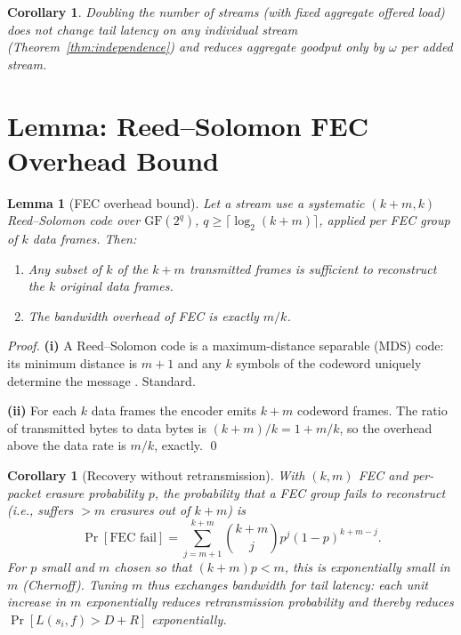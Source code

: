 \documentclass[11pt,a4paper]{article}
\newtheorem{lemma}[theorem]{Lemma}
\newtheorem{corollary}[theorem]{Corollary}
\begin{document}
\begin{corollary}
Doubling the number of streams (with fixed aggregate offered load) does
not change tail latency on any individual stream
(Theorem~\ref{thm:independence}) and reduces aggregate goodput only by
$\omega$ per added stream.
\end{corollary}

\section{Lemma: Reed--Solomon FEC Overhead Bound}

\begin{lemma}[FEC overhead bound]\label{lem:fec}
Let a stream use a systematic $(k+m, k)$ Reed--Solomon code over
$\mathrm{GF}(2^q)$, $q \ge \lceil \log_2(k+m) \rceil$, applied per FEC
group of $k$ data frames. Then:
\begin{enumerate}[label=(\roman*)]
\item Any subset of $k$ of the $k+m$ transmitted frames is sufficient
to reconstruct the $k$ original data frames.
\item The bandwidth overhead of FEC is exactly $m/k$.
\end{enumerate}
\end{lemma}

\begin{proof}
\textbf{(i)} A Reed--Solomon code is a maximum-distance separable (MDS)
code: its minimum distance is $m+1$ and any $k$ symbols of the
codeword uniquely determine the message
\cite{reed1960}. Standard.

\textbf{(ii)} For each $k$ data frames the encoder emits $k+m$
codeword frames. The ratio of transmitted bytes to data bytes is
$(k+m)/k = 1 + m/k$, so the overhead above the data rate is $m/k$,
exactly. \qed
\end{proof}

\begin{corollary}[Recovery without retransmission]
With $(k, m)$ FEC and per-packet erasure probability $p$, the
probability that a FEC group fails to reconstruct (i.e., suffers $> m$
erasures out of $k+m$) is
\[
\Pr[\text{FEC fail}] = \sum_{j=m+1}^{k+m}
\binom{k+m}{j} p^j (1-p)^{k+m-j}.
\]
For $p$ small and $m$ chosen so that $(k+m) p < m$, this is exponentially
small in $m$ (Chernoff). Tuning $m$ thus exchanges bandwidth for tail
latency: each unit increase in $m$ exponentially reduces retransmission
probability and thereby reduces $\Pr[L(s_i, f) > D + R]$ exponentially.
\end{corollary}
\end{document}
